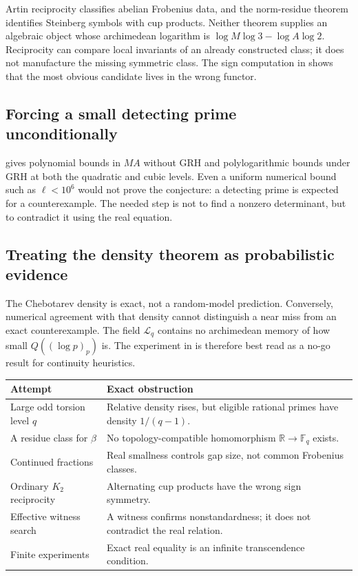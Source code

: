 \documentclass[11pt]{article}
\numberwithin{equation}{section}
\theoremstyle{definition}
\theoremstyle{remark}
\newcommand{\F}{\mathbb F}
\begin{document}
Artin reciprocity classifies abelian Frobenius data, and the norm-residue theorem identifies
Steinberg symbols with cup products.  Neither theorem supplies an algebraic object whose
archimedean logarithm is
\(\log M\log3-\log A\log2\).  Reciprocity can compare local invariants of an already
constructed class; it does not manufacture the missing symmetric class.  The sign computation
in  shows that the most obvious candidate lives in the wrong functor.

\subsection{Forcing a small detecting prime unconditionally}

 gives polynomial bounds in \(MA\) without GRH and
polylogarithmic bounds under GRH at both the quadratic and cubic levels.  Even a uniform
numerical bound such as \(\ell<10^6\) would
not prove the conjecture: a detecting prime is expected for a counterexample.  The needed
step is not to find a nonzero determinant, but to contradict it using the real equation.

\subsection{Treating the density theorem as probabilistic evidence}

The Chebotarev density is exact, not a random-model prediction.  Conversely, numerical
agreement with that density cannot distinguish a near miss from an exact counterexample.
The field \(\mathcal L_q\) contains no archimedean memory of how small
\(Q((\log p)_p)\) is.  The experiment in  is therefore best read as a
no-go result for continuity heuristics.

\begin{center}
\begin{tabularx}{0.96\textwidth}{@{}p{}X@{}}
\toprule
Attempt & Exact obstruction \\
\midrule
Large odd torsion level \(q\) & Relative density rises, but eligible rational primes have density
\(1/(q-1)\). \\
A residue class for \(\beta\) & No topology-compatible homomorphism
\(\mathbb R\to\F_q\) exists. \\
Continued fractions & Real smallness controls gap size, not common Frobenius classes. \\
Ordinary \(K_2\) reciprocity & Alternating cup products have the wrong sign symmetry. \\
Effective witness search & A witness confirms nonstandardness; it does not contradict the
real relation. \\
Finite experiments & Exact real equality is an infinite transcendence condition. \\
\bottomrule
\end{tabularx}
\end{center}
\end{document}

